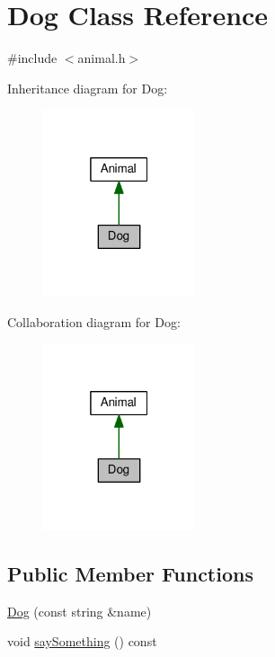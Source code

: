 \hypertarget{classDog}{}\section{Dog Class Reference}
\label{classDog}


{\ttfamily \#include $<$animal.\+h$>$}



Inheritance diagram for Dog\+:\nopagebreak
\begin{figure}[H]
\begin{center}
\leavevmode
\includegraphics[width=127pt]{classDog__inherit__graph}
\end{center}
\end{figure}


Collaboration diagram for Dog\+:\nopagebreak
\begin{figure}[H]
\begin{center}
\leavevmode
\includegraphics[width=127pt]{classDog__coll__graph}
\end{center}
\end{figure}
\subsection*{Public Member Functions}
\begin{DoxyCompactItemize}
\item 
\hyperlink{classDog_ad68949296d9449aa7d290e6f07d92787}{Dog} (const string \&name)
\item 
void \hyperlink{classDog_aa76235fa1a137f2fccf5138e5b92d0b3}{say\+Something} () const
\end{DoxyCompactItemize}
